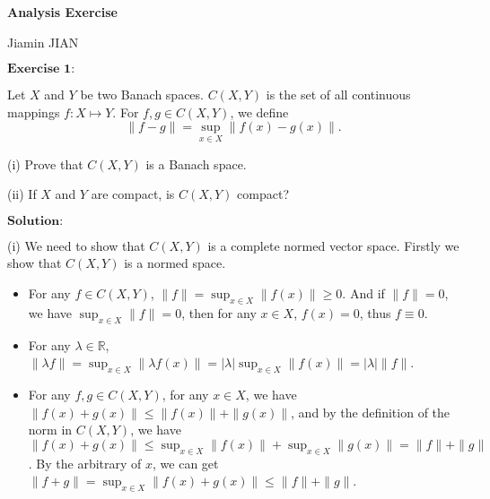\documentclass[12pt,a4paper]{ctexart}
\begin{document}
\begin{center}
\textbf{Analysis Exercise}
\vspace{8pt}

Jiamin JIAN
\end{center}

\vspace{12pt}

$\textbf{Exercise 1:}$

Let $X$ and $Y$ be two Banach spaces. $C(X, Y)$ is the set of all continuous mappings $f: X \mapsto Y$. For $f, g \in C(X, Y)$, we define
\begin{equation*}
    \|f - g\| = \sup_{x \in X} \|f(x) - g(x)\|.
\end{equation*}

(i) Prove that $C(X, Y)$ is a Banach space.

(ii) If $X$ and $Y$ are compact, is $C(X, Y)$ compact?

\vspace{8pt}

$\textbf{Solution:}$

(i) We need to show that $C(X, Y)$ is a complete normed vector space. Firstly we show that $C(X, Y)$ is a normed space. 
\begin{itemize}
    \item For any $f \in C(X, Y)$, $\|f\| = \sup_{x \in X} \|f(x)\| \geq 0$. And if $\|f\| = 0$, we have $\sup_{x \in X} \|f\| = 0$, then for any $x \in X$, $f(x) = 0$, thus $f \equiv 0$.
    \item For any $\lambda \in \mathbb{R}$, $\| \lambda f\| = \sup_{x \in X} \|\lambda f(x)\| = |\lambda| \sup_{x \in X} \|f(x)\| = |\lambda| \|f\|$.
    \item For any $f, g \in C(X, Y)$, for any $x \in X$, we have $\|f(x) + g(x)\| \leq \|f(x)\| + \|g(x)\|$, and by the definition of the norm in $C(X, Y)$, we have $\|f(x) + g(x)\| \leq \sup_{x \in X} \|f(x)\| + \sup_{x \in X} \|g(x)\| = \|f\| + \|g\|$. By the arbitrary of $x$, we can get $\|f + g\| = \sup_{x \in X} \|f(x) + g(x)\| \leq \|f\| + \|g\|$.
\end{itemize}
\end{document}
